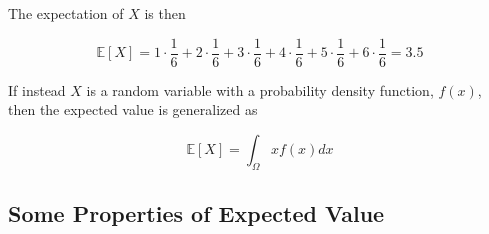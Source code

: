 The expectation of $X$ is then

\begin{equation*}
\mathbb{E}[X]=1\cdot {\frac {1}{6}}+2\cdot {\frac {1}{6}}+3\cdot {\frac {1}{6}}+4\cdot {\frac {1}{6}}+5\cdot {\frac {1}{6}}+6\cdot {\frac {1}{6}}=3.5
\end{equation*}

If instead $X$ is a random variable with a probability density function, $f(x)$, then the expected value is generalized as

\begin{equation}
\mathbb{E}[X]=\int_{\Omega}xf(x)dx
\end{equation}
%

\subsection{Some Properties of Expected Value}
\label{some-properties}

